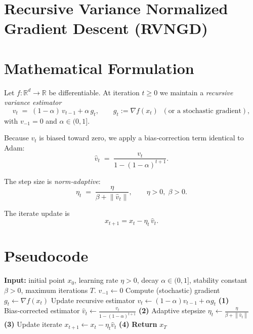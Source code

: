 \documentclass{article}
\newcommand{\norm}[1]{\left\lVert #1 \right\rVert}
\begin{document}
\section*{Recursive Variance Normalized Gradient Descent (RVNGD)}

\section*{Mathematical Formulation}
Let $f:\mathbb{R}^d\rightarrow\mathbb{R}$ be differentiable.  
At iteration $t\ge 0$ we maintain a \emph{recursive variance estimator}
\begin{equation}
    v_t \;=\;(1-\alpha)\,v_{t-1}+\alpha\,g_t, \qquad 
    g_t:=\nabla f(x_t) \;\;(\text{or a stochastic gradient}), \tag{1}
\end{equation}
with $v_{-1}=0$ and $\alpha\in(0,1]$.

Because $v_t$ is biased toward zero, we apply a bias‑correction term identical to Adam:
\begin{equation}
    \hat v_t \;=\;\frac{v_t}{1-(1-\alpha)^{t+1}}. \tag{2}
\end{equation}

The step size is \emph{norm‑adaptive}:
\begin{equation}
    \eta_t \;=\;\frac{\eta}{\beta+\norm{\hat v_t}}, \qquad \eta>0,\;\beta>0. \tag{3}
\end{equation}

The iterate update is
\begin{equation}
    x_{t+1}=x_t-\eta_t\,\hat v_t . \tag{4}
\end{equation}

\section*{Pseudocode}
\begin{algorithm}[H]
\caption{Recursive Variance Normalized Gradient Descent (RVNGD)}
\begin{algorithmic}[1]
\STATE \textbf{Input:} initial point $x_0$, learning rate $\eta>0$, 
                decay $\alpha\in(0,1]$, stability constant $\beta>0$, 
                maximum iterations $T$.
\STATE $v_{-1}\gets 0$
    \STATE Compute (stochastic) gradient $g_t \gets \nabla f(x_t)$
    \STATE Update recursive estimator $v_t \gets (1-\alpha)v_{t-1}+\alpha g_t$ \hfill\textbf{(1)}
    \STATE Bias‑corrected estimator 
          $\displaystyle \hat v_t \gets \frac{v_t}{1-(1-\alpha)^{t+1}}$ \hfill\textbf{(2)}
    \STATE Adaptive stepsize $\displaystyle \eta_t \gets \frac{\eta}{\beta+\norm{\hat v_t}}$ \hfill\textbf{(3)}
    \STATE Update iterate $x_{t+1}\gets x_t-\eta_t\hat v_t$ \hfill\textbf{(4)}
\ENDFOR
\STATE \textbf{Return} $x_T$
\end{algorithmic}
\end{algorithm}
\end{document}
